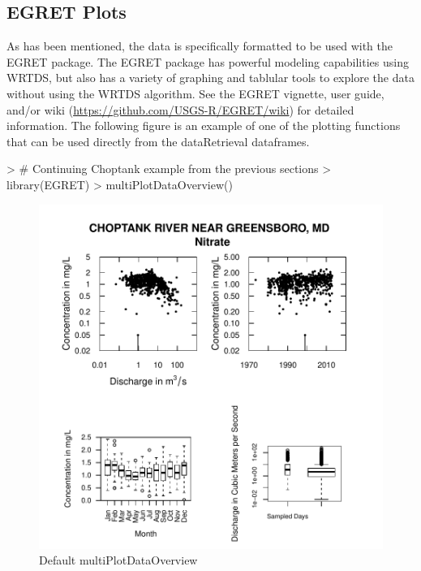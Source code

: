 \documentclass[a4paper,11pt]{article}
\begin{document}
\FloatBarrier
\subsection{EGRET Plots}
As has been mentioned, the data is specifically formatted to be used with the EGRET package. The EGRET package has powerful modeling capabilities using WRTDS, but also has a variety of graphing and tablular tools to explore the data without using the WRTDS algorithm. See the EGRET vignette, user guide, and/or wiki (\url{https://github.com/USGS-R/EGRET/wiki}) for detailed information. The following figure is an example of one of the plotting functions that can be used directly from the dataRetrieval dataframes.

\begin{Schunk}
\begin{Sinput}
> # Continuing Choptank example from the previous sections
> library(EGRET)
> multiPlotDataOverview()
\end{Sinput}
\end{Schunk}

\begin{figure}[ht]
\begin{center}

\includegraphics{dataRetrieval-figegretEx}
\end{center}
\caption{Default multiPlotDataOverview}
\label{fig:multiPlotDataOverview}
\end{figure}
\end{document}
